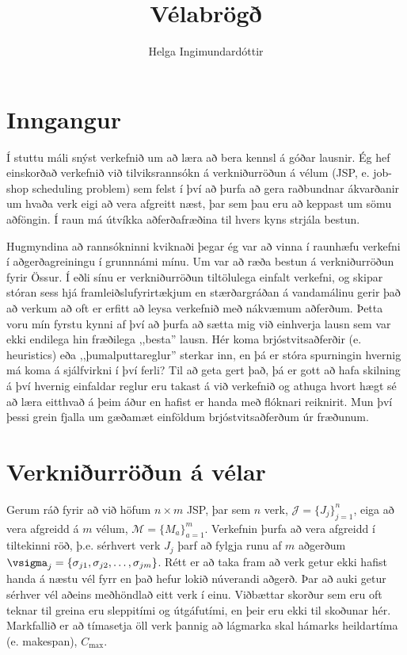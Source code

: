 \documentclass[]{article}
\title{Vélabrögð} %
\author{Helga Ingimundardóttir}
\begin{document}
\maketitle


\section{Inngangur}
Í stuttu máli snýst verkefnið um að læra að bera kennsl á góðar lausnir. 
Ég hef einskorðað verkefnið við tilviksrannsókn á verkniðurröðun á vélum (JSP, 
e. job-shop scheduling problem) 
sem felst í því að þurfa að gera raðbundnar ákvarðanir um hvaða verk eigi 
að vera afgreitt næst, þar sem þau eru að keppast um sömu aðföngin.
Í raun má útvíkka aðferðafræðina til hvers kyns strjála bestun. 

Hugmyndina að rannsókninni kviknaði þegar ég var að vinna í raunhæfu verkefni í 
aðgerðagreiningu í grunnnámi mínu. Um var að ræða bestun á verkniðurröðun fyrir 
Össur. Í eðli sínu er verkniðurröðun tiltölulega einfalt verkefni, og skipar 
stóran sess hjá framleiðslufyrirtækjum en stærðargráðan á vandamálinu gerir það 
að verkum að oft er erfitt að leysa verkefnið með nákvæmum aðferðum. 
Þetta voru mín fyrstu kynni af því að þurfa að sætta mig við einhverja lausn 
sem var ekki endilega hin fræðilega ,,besta'' lausn. 
Hér koma brjóstvitsaðferðir (e. heuristics) eða ,,þumalputtareglur'' sterkar 
inn, en þá er stóra spurningin hvernig má koma á sjálfvirkni í því ferli? 
Til að geta gert það, þá er gott að hafa skilning á því hvernig einfaldar 
reglur eru takast á við verkefnið og athuga hvort hægt sé að læra eitthvað á 
þeim áður en hafist er handa með flóknari reiknirit. 
Mun því þessi grein fjalla um gæðamæt einföldum brjóstvitsaðferðum úr fræðunum. 

\section{Verkniðurröðun á vélar}
Gerum ráð fyrir að við höfum $n\times m$ JSP, 
þar sem $n$ verk, $\mathcal{J}=\{J_j\}_{j=1}^n$, 
eiga að vera afgreidd á $m$ vélum, $\mathcal{M}=\{M_a\}_{a=1}^m$. 
Verkefnin þurfa að vera afgreidd í tiltekinni röð, þ.e. sérhvert verk $J_j$ 
þarf að fylgja runu af $m$ aðgerðum 
$\vsigma_j=\{\sigma_{j1},\sigma_{j2},\dotsc,\sigma_{jm}\}$. 
Rétt er að taka fram að verk getur ekki hafist handa á næstu vél fyrr en það 
hefur lokið núverandi aðgerð. 
Þar að auki getur sérhver vél aðeins meðhöndlað eitt verk í einu. 
Viðbættar skorður sem eru oft teknar til greina eru sleppitími og útgáfutími, 
en þeir eru ekki til skoðunar hér.
Markfallið er að tímasetja öll verk þannig að lágmarka skal hámarks heildartíma 
(e. makespan), $C_{\max}$. 
\end{document}
